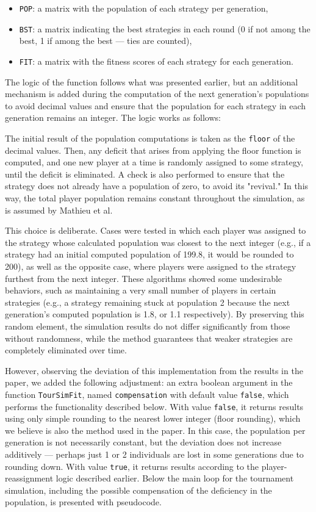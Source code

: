 \begin{itemize}
    \item \texttt{POP}: a matrix with the population of each strategy per generation,
    \item \texttt{BST}: a matrix indicating the best strategies in each round (0 if not among the best, 1 if among the best — ties are counted),
    \item \texttt{FIT}: a matrix with the fitness scores of each strategy for each generation.
\end{itemize}

The logic of the function follows what was presented earlier, but an additional mechanism is added during the computation of the next generation’s populations to avoid decimal values and ensure that the population for each strategy in each generation remains an integer. The logic works as follows:

The initial result of the population computations is taken as the \texttt{floor} of the decimal values. Then, any deficit that arises from applying the floor function is computed, and one new player at a time is randomly assigned to some strategy, until the deficit is eliminated. A check is also performed to ensure that the strategy does not already have a population of zero, to avoid its "revival." In this way, the total player population remains constant throughout the simulation, as is assumed by Mathieu et al.

This choice is deliberate. Cases were tested in which each player was assigned to the strategy whose calculated population was closest to the next integer (e.g., if a strategy had an initial computed population of 199.8, it would be rounded to 200), as well as the opposite case, where players were assigned to the strategy furthest from the next integer. These algorithms showed some undesirable behaviors, such as maintaining a very small number of players in certain strategies (e.g., a strategy remaining stuck at population 2 because the next generation’s computed population is 1.8, or 1.1 respectively). By preserving this random element, the simulation results do not differ significantly from those without randomness, while the method guarantees that weaker strategies are completely eliminated over time.

However, observing the deviation of this implementation from the results in the paper, we added the following adjustment: an extra boolean argument in the function \texttt{TourSimFit}, named \texttt{compensation} with default value \texttt{false}, which performs the functionality described below. With value \texttt{false}, it returns results using only simple rounding to the nearest lower integer (floor rounding), which we believe is also the method used in the paper. In this case, the population per generation is not necessarily constant, but the deviation does not increase additively — perhaps just 1 or 2 individuals are lost in some generations due to rounding down. With value \texttt{true}, it returns results according to the player-reassignment logic described earlier. Below the main loop for the tournament simulation, including the possible compensation of the deficiency in the population, is presented with pseudocode.

